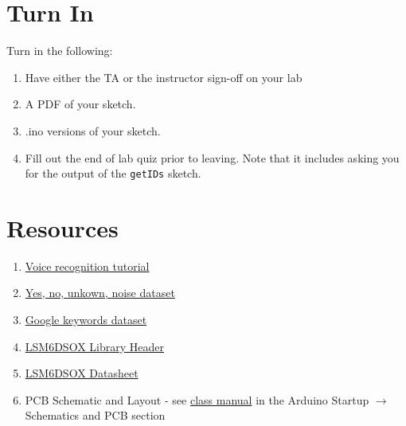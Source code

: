 

\section{Turn In}
Turn in the following:
\begin{enumerate}
    \item Have either the TA or the instructor sign-off on your lab
    \item A PDF of your sketch.
    \item .ino versions of your sketch.
    \item Fill out the end of lab quiz prior to leaving. Note that it includes asking you 
            for the output of the \lstinline$getIDs$ sketch. 
\end{enumerate}

\section{Resources}\label{sec:machinelearningresources}
\begin{enumerate}
    \item \href{https://pietropoluzzi.it/blog/ml/edge-impulse/voice-recognition/}{Voice recognition tutorial}
    \item \href{https://docs.edgeimpulse.com/docs/pre-built-datasets/keyword-spotting}{Yes, no, unkown, noise dataset}
    \item \href{https://blog.research.google/2017/08/launching-speech-commands-dataset.html}{Google keywords dataset}
    \item \href{https://github.com/stm32duino/LSM6DSOX/blob/main/src/LSM6DSOXSensor.h}{LSM6DSOX Library Header}
    \item \href{https://www.st.com/resource/en/datasheet/lsm6dsox.pdf}{LSM6DSOX Datasheet}
    \item PCB Schematic and Layout - see 
            \href{https://github.com/semcneil/Fundamentals-of-Microcontrollers-Manual}{class manual} 
            in the Arduino Startup $\rightarrow$ Schematics and PCB section
\end{enumerate}

